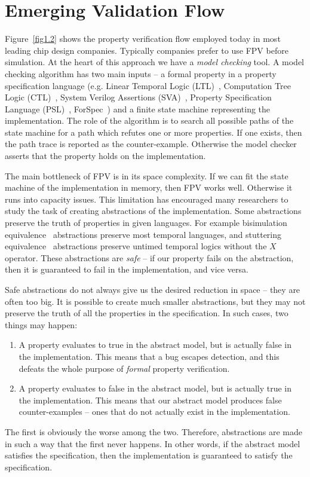 \section{Emerging Validation Flow} \label{sec1.1}
Figure~\ref{fig1.2} shows the property verification flow employed today 
in most leading chip design companies. Typically companies prefer to use 
FPV before simulation. At the heart of this approach we have a 
{\em model checking} tool. A model checking algorithm has two main
inputs -- a formal property in a property specification language 
(e.g. Linear Temporal Logic (LTL)~\cite{pnueli:77}, Computation Tree Logic 
(CTL)~\cite{clarke:86}, System Verilog Assertions (SVA)~\cite{sva}, 
Property Specification Language (PSL)~\cite{psl}, ForSpec~\cite{forspec}) 
and a finite state machine representing the
implementation. The role of the algorithm is to search all possible paths
of the state machine for a path which refutes one or more properties. If one
exists, then the path trace is reported as the counter-example. Otherwise
the model checker asserts that the property holds on the implementation.

\noindent
The main bottleneck of FPV is in its space complexity. If we can fit the
state machine of the implementation in memory, then FPV works well. Otherwise
it runs into capacity issues.
This limitation has encouraged many researchers to study the task of creating
abstractions of the implementation. Some abstractions preserve the truth of
properties in given languages. For example bisimulation 
equivalence~\cite{clarke:00} abstractions preserve most temporal languages, 
and stuttering equivalence~\cite{clarke:00} abstractions preserve untimed 
temporal logics without the $X$ operator. These
abstractions are {\em safe} -- if our property fails on the abstraction, then
it is guaranteed to fail in the implementation, and vice versa. 

\noindent
Safe abstractions do not always give us the desired reduction in space -- they
are often too big. It is possible to create much smaller abstractions, but
they may not preserve the truth of all the properties in the specification.
In such cases, two things may happen:
\begin{enumerate}

\item A property evaluates to true in the abstract model, but is actually
    false in the implementation. This means that a bug escapes detection,
    and this defeats the whole purpose of {\em formal} property
    verification.

\item A property evaluates to false in the abstract model, but is actually
    true in the implementation. This means that our abstract model
    produces false counter-examples -- ones that do not actually exist
    in the implementation.

\end{enumerate} 
\noindent
The first is obviously the worse among the two. Therefore, abstractions are
made in such a way that the first never happens. In other words, if the
abstract model satisfies the specification, then the implementation is
guaranteed to satisfy the specification.

